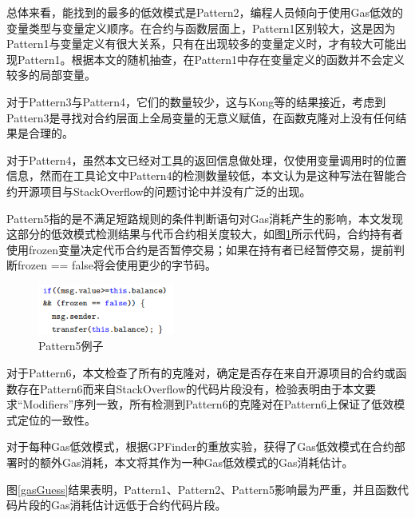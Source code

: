 总体来看，能找到的最多的低效模式是Pattern2，编程人员倾向于使用Gas低效的变量类型与变量定义顺序。在合约与函数层面上，Pattern1区别较大，这是因为Pattern1与变量定义有很大关系，只有在出现较多的变量定义时，才有较大可能出现Pattern1。根据本文的随机抽查，在Pattern1中存在变量定义的函数并不会定义较多的局部变量。

对于Pattern3与Pattern4，它们的数量较少，这与Kong等\cite{gasPattern}的结果接近，考虑到Pattern3是寻找对合约层面上全局变量的无意义赋值，在函数克隆对上没有任何结果是合理的。

对于Pattern4，虽然本文已经对工具的返回信息做处理，仅使用变量调用时的位置信息，然而在工具论文中Pattern4的检测数量较低，本文认为是这种写法在智能合约开源项目与StackOverflow的问题讨论中并没有广泛的出现。

Pattern5指的是不满足短路规则的条件判断语句对Gas消耗产生的影响，本文发现这部分的低效模式检测结果与代币合约相关度较大，如图\ref{pattern5-example}所示代码，合约持有者使用frozen变量决定代币合约是否暂停交易；如果在持有者已经暂停交易，提前判断frozen == false将会使用更少的字节码。

\begin{figure}[htbp]
\centering
\includegraphics[width=0.4\textwidth]{figures/pattern5-example.png}
\caption{Pattern5例子}
\label{pattern5-example}
\end{figure}

对于Pattern6，本文检查了所有的克隆对，确定是否存在来自开源项目的合约或函数存在Pattern6而来自StackOverflow的代码片段没有，检验表明由于本文要求“Modifiers”序列一致，所有检测到Pattern6的克隆对在Pattern6上保证了低效模式定位的一致性。



对于每种Gas低效模式，根据GPFinder的重放实验，获得了Gas低效模式在合约部署时的额外Gas消耗，本文将其作为一种Gas低效模式的Gas消耗估计。

图\ref{gasGuess}结果表明，Pattern1、Pattern2、Pattern5影响最为严重，并且函数代码片段的Gas消耗估计远低于合约代码片段。


